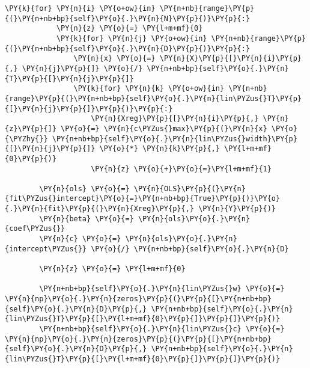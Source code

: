 \begin{Verbatim}[commandchars=\\\{\}]
        \PY{k}{for} \PY{n}{i} \PY{o+ow}{in} \PY{n+nb}{range}\PY{p}{(}\PY{n+nb+bp}{self}\PY{o}{.}\PY{n}{N}\PY{p}{)}\PY{p}{:}
            \PY{n}{z} \PY{o}{=} \PY{l+m+mf}{0}
            \PY{k}{for} \PY{n}{j} \PY{o+ow}{in} \PY{n+nb}{range}\PY{p}{(}\PY{n+nb+bp}{self}\PY{o}{.}\PY{n}{D}\PY{p}{)}\PY{p}{:}
                \PY{n}{x} \PY{o}{=} \PY{n}{X}\PY{p}{[}\PY{n}{i}\PY{p}{,} \PY{n}{j}\PY{p}{]} \PY{o}{/} \PY{n+nb+bp}{self}\PY{o}{.}\PY{n}{T}\PY{p}{[}\PY{n}{j}\PY{p}{]}
                \PY{k}{for} \PY{n}{k} \PY{o+ow}{in} \PY{n+nb}{range}\PY{p}{(}\PY{n+nb+bp}{self}\PY{o}{.}\PY{n}{lin\PYZus{}T}\PY{p}{[}\PY{n}{j}\PY{p}{]}\PY{p}{)}\PY{p}{:}
                    \PY{n}{Xreg}\PY{p}{[}\PY{n}{i}\PY{p}{,} \PY{n}{z}\PY{p}{]} \PY{o}{=} \PY{n}{c\PYZus{}max}\PY{p}{(}\PY{n}{x} \PY{o}{\PYZhy{}} \PY{n+nb+bp}{self}\PY{o}{.}\PY{n}{lin\PYZus{}width}\PY{p}{[}\PY{n}{j}\PY{p}{]} \PY{o}{*} \PY{n}{k}\PY{p}{,} \PY{l+m+mf}{0}\PY{p}{)}
                    \PY{n}{z} \PY{o}{+}\PY{o}{=}\PY{l+m+mf}{1}

        \PY{n}{ols} \PY{o}{=} \PY{n}{OLS}\PY{p}{(}\PY{n}{fit\PYZus{}intercept}\PY{o}{=}\PY{n+nb+bp}{True}\PY{p}{)}\PY{o}{.}\PY{n}{fit}\PY{p}{(}\PY{n}{Xreg}\PY{p}{,} \PY{n}{Y}\PY{p}{)}
        \PY{n}{beta} \PY{o}{=} \PY{n}{ols}\PY{o}{.}\PY{n}{coef\PYZus{}}
        \PY{n}{c} \PY{o}{=} \PY{n}{ols}\PY{o}{.}\PY{n}{intercept\PYZus{}} \PY{o}{/} \PY{n+nb+bp}{self}\PY{o}{.}\PY{n}{D}

        \PY{n}{z} \PY{o}{=} \PY{l+m+mf}{0}

        \PY{n+nb+bp}{self}\PY{o}{.}\PY{n}{lin\PYZus{}w} \PY{o}{=} \PY{n}{np}\PY{o}{.}\PY{n}{zeros}\PY{p}{(}\PY{p}{[}\PY{n+nb+bp}{self}\PY{o}{.}\PY{n}{D}\PY{p}{,} \PY{n+nb+bp}{self}\PY{o}{.}\PY{n}{lin\PYZus{}T}\PY{p}{[}\PY{l+m+mf}{0}\PY{p}{]}\PY{p}{]}\PY{p}{)}
        \PY{n+nb+bp}{self}\PY{o}{.}\PY{n}{lin\PYZus{}c} \PY{o}{=} \PY{n}{np}\PY{o}{.}\PY{n}{zeros}\PY{p}{(}\PY{p}{[}\PY{n+nb+bp}{self}\PY{o}{.}\PY{n}{D}\PY{p}{,} \PY{n+nb+bp}{self}\PY{o}{.}\PY{n}{lin\PYZus{}T}\PY{p}{[}\PY{l+m+mf}{0}\PY{p}{]}\PY{p}{]}\PY{p}{)}


\end{Verbatim}
